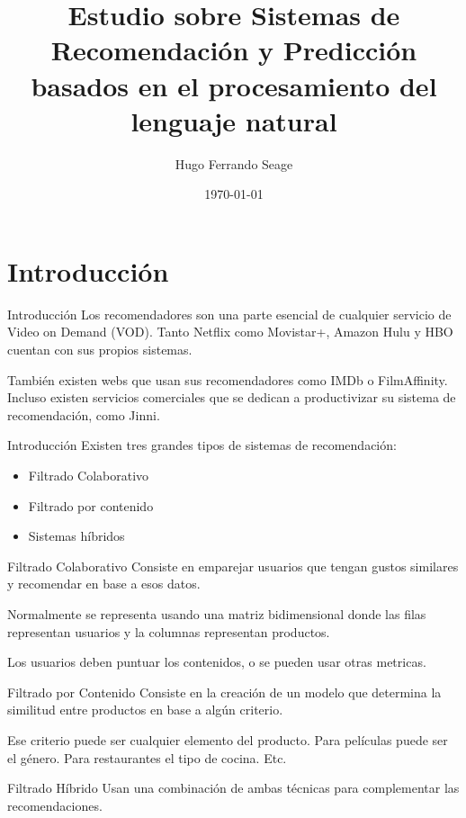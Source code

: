 \documentclass{beamer}
\title{Estudio sobre Sistemas de Recomendación y Predicción basados en el procesamiento del lenguaje natural}
\date{\today}
\author{Hugo Ferrando Seage}
\institute{Universidad Europea de Madrid\\Escuela de Arquitectura, Ingeniería y Diseño}
\begin{document}
  \maketitle

  \section{Introducción}
  \begin{frame}{Introducción}
      Los recomendadores son una parte esencial de cualquier servicio de Video on Demand (VOD). Tanto Netflix como Movistar+, Amazon Hulu y HBO cuentan con sus propios sistemas.

      También existen webs que usan sus recomendadores como IMDb o FilmAffinity. Incluso existen servicios comerciales que se dedican a productivizar su sistema de recomendación, como Jinni.
  \end{frame}

  \begin{frame}{Introducción}
      Existen tres grandes tipos de sistemas de recomendación:
      \begin{itemize}
          \item Filtrado Colaborativo
          \item Filtrado por contenido
          \item Sistemas híbridos
      \end{itemize}
  \end{frame}

  \begin{frame}{Filtrado Colaborativo}
      Consiste en emparejar usuarios que tengan gustos similares y recomendar en base a esos datos.

      Normalmente se representa usando una matriz bidimensional donde las filas representan usuarios y la columnas representan productos.

      Los usuarios deben puntuar los contenidos, o se pueden usar otras metricas.
  \end{frame}

  \begin{frame}{Filtrado por Contenido}
      Consiste en la creación de un modelo que determina la similitud entre productos en base a algún criterio.

      Ese criterio puede ser cualquier elemento del producto. Para películas puede ser el género. Para restaurantes el tipo de cocina. Etc.
  \end{frame}

  \begin{frame}{Filtrado Híbrido}
      Usan una combinación de ambas técnicas para complementar las recomendaciones.
  \end{frame}
\end{document}
